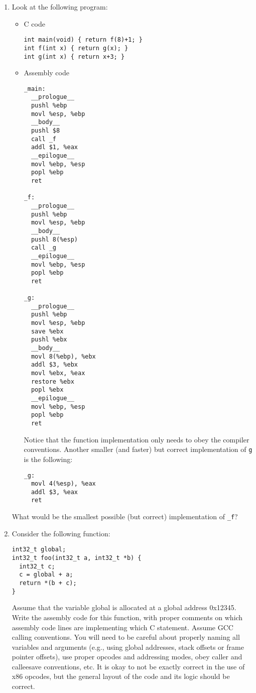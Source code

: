 \begin{enumerate}
\item Look at the following program:
\begin{itemize}
\item C code
\begin{verbatim}
int main(void) { return f(8)+1; }
int f(int x) { return g(x); }
int g(int x) { return x+3; }
\end{verbatim}
\item Assembly code
\begin{verbatim}
_main:
  __prologue__
  pushl %ebp
  movl %esp, %ebp
  __body__
  pushl $8
  call _f
  addl $1, %eax
  __epilogue__
  movl %ebp, %esp
  popl %ebp
  ret

_f:
  __prologue__
  pushl %ebp
  movl %esp, %ebp
  __body__
  pushl 8(%esp)
  call _g
  __epilogue__
  movl %ebp, %esp
  popl %ebp
  ret

_g:
  __prologue__
  pushl %ebp
  movl %esp, %ebp
  save %ebx
  pushl %ebx
  __body__
  movl 8(%ebp), %ebx
  addl $3, %ebx
  movl %ebx, %eax
  restore %ebx
  popl %ebx
  __epilogue__
  movl %ebp, %esp
  popl %ebp
  ret
\end{verbatim}
Notice that the function implementation only needs to obey the compiler conventions.
Another smaller (and faster) but correct implementation of {\tt g} is the following:
\begin{verbatim}
_g:
  movl 4(%esp), %eax
  addl $3, %eax
  ret
\end{verbatim}
\end{itemize}
What would be the smallest possible (but correct) implementation of {\tt \_f}?

\item Consider the following function:
\begin{verbatim}
int32_t global;
int32_t foo(int32_t a, int32_t *b) {
  int32_t c;
  c = global + a;
  return *(b + c);
}
\end{verbatim}
Assume that the variable global is allocated at a global address 0x12345. Write
the assembly code for this function, with proper comments on which assembly code
lines are implementing which C statement. Assume GCC calling conventions. You will
need to be careful about properly naming all variables and
arguments (e.g., using global addresses, stack offsets or frame pointer offsets),
use proper opcodes and addressing modes, obey caller and callee­save conventions, etc. It is
okay to not be exactly correct in the use of x86 opcodes, but the general layout of the code
and its logic should be correct.

\end{enumerate}

